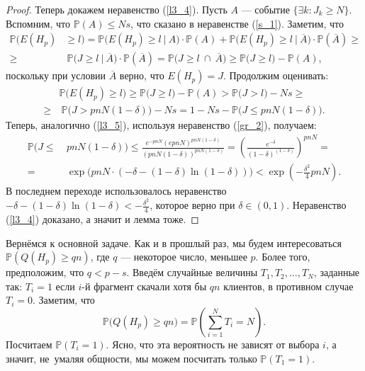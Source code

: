 \documentclass{matmex-diploma-custom}
\newcommand{\PRob}{\mathbb P}
\newcommand{\leqs}{\leqslant}
\newcommand{\geqs}{\geqslant}
\theoremstyle{named}
\begin{document}
\begin{proof}
Теперь докажем неравенство (\ref{l3_4}). Пусть $A$ --- событие $\{\exists k : J_k \geqs N\}$.
Вспомним, что $\PRob(A) \leqs Ns$, что сказано в неравенстве (\ref{s_1}). Заметим, что
\begin{equation}\begin{aligned}
\PRob\Big( E(H_p) &\geqs l \Big) = 
	\PRob\Big(E(H_p) \geqs l~\big|~A\Big) \cdot \PRob(A) + \PRob\Big(E(H_p) \geqs l~\big|~\overline{A}\Big) \cdot \PRob(\overline{A})
\geqs
\\
\geqs
&~\PRob\Big(J \geqs l~\big|~\overline{A}\Big) \cdot \PRob(\overline{A})
	=
\PRob\Big(J \geqs l~\cap~\overline{A} \Big) 
	\geqs
\PRob\Big(J \geqs l \Big) - \PRob(A),
\end{aligned}\end{equation}
поскольку при условии $\overline{A}$ верно, что $E(H_p) = J$. Продолжим оценивать:
\begin{equation}\begin{aligned}
&\PRob\Big( E(H_p) \geqs l \Big) 
	\geqs 
\PRob\Big(J \geqs l \Big) - \PRob(A) 
	>
\PRob\Big(J > l \Big) - Ns
	\geqs
\\
	\geqs
&~\PRob\Big(J > pnN(1-\delta) \Big) - Ns
	=
1 - Ns - \PRob\Big( J \leqs pnN(1-\delta)  \Big).
\end{aligned}\end{equation}
Теперь, аналогично (\ref{l3_5}), используя неравенство (\ref{gr_2}), получаем:
\begin{equation}\begin{aligned}
\PRob\big( J \leqs&~pnN(1-\delta) \big) 
	\leqs
\frac{
	e^{-pnN}(epnN)^{pnN(1-\delta)}
}{
	(pnN(1-\delta))^{pnN(1-\delta)}
}
	=
\left( \frac{e^{-\delta}}{(1-\delta)^{(1-\delta)}} \right)^{pnN}
	=
\\
	=
&~\exp\big(pnN \cdot (-\delta - (1-\delta)\ln(1-\delta)) \big)
	<
\exp\left(-\frac{\delta^2}{4}pnN\right).
\end{aligned}\end{equation}
В последнем переходе использовалось неравенство $-\delta - (1-\delta)\ln(1-\delta) < - \frac{\delta^2}{4}$, 
которое верно при $\delta \in (0,1)$. Неравенство (\ref{l3_4}) доказано, а значит и лемма тоже.
\end{proof}

\smallskip

Вернёмся к основной задаче. 
Как и в прошлый раз, мы будем интересоваться
$\PRob(Q(H_p) \geqs qn)$, где $q$ --- некоторое число, меньшее $p$.
Более того, предположим, что $q < p - s$.
Введём случайные величины $T_1, T_2, \dots, T_N$, заданные так: $T_i = 1$ если $i$-й фрагмент скачали хотя бы $qn$ клиентов, 
в противном случае $T_i = 0$. Заметим, что 
\begin{equation}
\PRob\Big(Q(H_p) \geqs qn\Big) = \PRob\left(\sum\limits_{i=1}^N T_i = N\right).
\end{equation}
Посчитаем $\PRob(T_i = 1)$. Ясно, что эта вероятность не зависят от выбора $i$, а значит, 
не~умаляя общности, мы можем посчитать только $\PRob(T_1 = 1)$.
\end{document}
